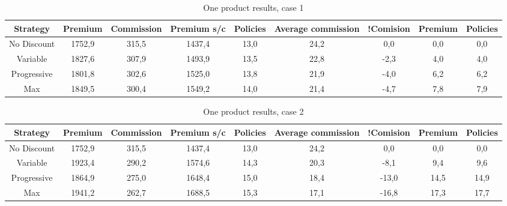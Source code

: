 \documentclass[review]{elsarticle}
\begin{document}

\begin{table}[htb]
\centering
\caption{One product results, case 1}
\label{tab:b3}
\begin{tabular}{c c c c c c c c c}
        \hline
        \hline
        Strategy & Premium & Commission & Premium s/c & Policies & Average commission & !Comision &Premium & Policies \\
        \hline
        No Discount & 1752,9 & 315,5 & 1437,4 & 13,0 & 24,2 &0,0 & 0,0 & 0,0\\
        \hline
        Variable &1827,6 & 307,9 & 1493,9 & 13,5 &22,8 & -2,3 & 4,0 & 4,0 \\
        \hline
        Progressive & 1801,8 & 302,6 & 1525,0 & 13,8 & 21,9 & -4,0 & 6,2 & 6,2 \\
        Max & 1849,5 & 300,4 & 1549,2 & 14,0 & 21,4 & -4,7 & 7,8 & 7,9 \\
        \hline
\end{tabular}
\end{table}

\begin{table}[htb]
\centering
\caption{One product results, case 2}
\label{tab:b4}
\begin{tabular}{c c c c c c c c c}
        \hline
        \hline
        Strategy & Premium & Commission & Premium s/c & Policies & Average commission & !Comision &Premium & Policies \\
        \hline
        No Discount & 1752,9 & 315,5 & 1437,4 & 13,0 & 24,2 &0,0 & 0,0 & 0,0\\
        \hline
        Variable &1923,4 & 290,2 & 1574,6 & 14,3 & 20,3 & -8,1 & 9,4 & 9,6 \\
        \hline
        Progressive & 1864,9 & 275,0 & 1648,4 & 15,0 & 18,4 & -13,0 & 14,5 & 14,9 \\
        Max & 1941,2 & 262,7 & 1688,5 & 15,3 & 17,1 & -16,8 & 17,3 & 17,7 \\
        \hline
\end{tabular}
\end{table}
\end{document}
